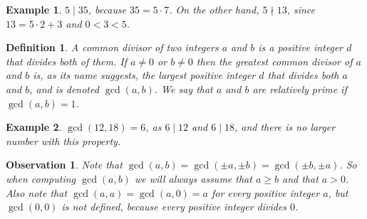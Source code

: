\documentclass[10pt,varwidth=6in,margin=0.2in,preview]{standalone}
\newtheorem*{_definition}{Definition}
\newtheorem*{_observation}{Observation}
\newtheorem*{_example}{Example}
\begin{document}
\begin{flushleft}
\begin{_example}
$5 \mid 35$, because $35 = 5 \cdot 7$. On the other hand, $5 \nmid 13$, since $13 = 5 \cdot 2 + 3$ and $0 < 3 < 5$.
\end{_example}


\begin{_definition}
A common divisor of two integers $a$ and $b$ is a positive integer $d$ that divides both of them. If $a \neq 0$ or $b \neq 0$ then the greatest common divisor of $a$ and $b$ is, as its name suggests, the largest positive integer $d$ that divides both $a$ and $b$, and is denoted $\gcd(a, b)$. We say that $a$ and $b$ are relatively prime if $\gcd(a, b) = 1$.
\end{_definition}

\begin{_example} $\gcd(12, 18) = 6$, as $6 \mid 12$ and $6 \mid 18$, and there is no larger number with this property.
\end{_example}

\begin{_observation} Note that $\gcd(a, b) = \gcd(\pm a, \pm b) = \gcd(\pm b, \pm a)$. So when computing $\gcd(a, b)$ we will always assume that $a \ge b$ and that $a > 0$. Also note that $\gcd(a, a) = \gcd(a, 0) = a$ for every positive integer $a$, but $\gcd(0, 0)$ is not defined, because every positive integer divides $0$.
\end{_observation}


\end{flushleft}
\end{document}
